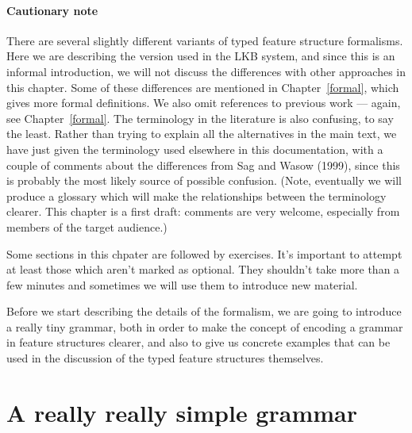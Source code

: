 \documentclass[12pt]{report}
\begin{document}
\paragraph{Cautionary note}  
There are several slightly different variants of
typed feature structure formalisms.  Here we are describing the 
version used in the LKB system, and since this is an informal
introduction, we will not discuss the differences with other approaches
in this chapter.  
Some of these differences are mentioned in Chapter~\ref{formal},
which gives more formal definitions.  We also omit references to
previous work --- again, see Chapter~\ref{formal}.
The terminology in the literature is also confusing, to say the least.  
Rather than trying to explain all the alternatives in the main
text, we have just given the terminology used elsewhere in this
documentation, with a couple of comments about the differences from
Sag and Wasow (1999), since this is probably the most likely
source of possible confusion.
(Note, eventually we will produce a glossary which will make the 
relationships between the terminology clearer.
This chapter is a first draft: comments are very welcome, especially
from members of the target audience.)

Some sections in this chpater are followed by
exercises.  It's important to attempt at least
those which aren't marked as 
optional.  They shouldn't take more than a few minutes 
and sometimes we will use them to introduce new material.

Before we start describing the details of the formalism,
we are going to introduce a really tiny grammar, both in order
to make the concept of encoding a grammar in feature structures clearer,
and also to give us concrete examples that can be used in the discussion
of the typed feature structures themselves.  


\section{A really really simple grammar}
\end{document}
